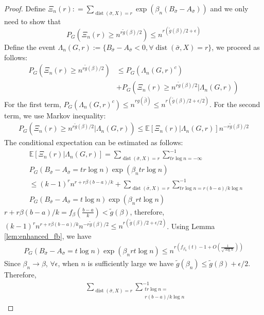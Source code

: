 \documentclass[journal]{IEEEtran}
\newcommand{\1}{\mathbbm{1}}
\DeclareMathOperator{\dist}{dist}
\begin{document}
\begin{proof}
Define $\Xi_n(r): = \sum_{\dist(\bar{\sigma}, X)=r}\exp(\beta_n(B_{\bar{\sigma}}-A_{\bar{\sigma}}))$ and we only need to show that
\begin{equation}
P_{G}(\Xi_n(r) \geq n^{r \tilde{g}(\beta) /2}) \leq  n^{r (\tilde{g}(\beta) /2 + \epsilon)}
\end{equation}
Define the event $\Lambda_n(G,r):=\{B_{\bar{\sigma}} -A_{\bar{\sigma}} < 0, \forall \dist(\bar{\sigma}, X)=r\}$,
we proceed as follows:
\begin{align*}
P_{G}(\Xi_n(r) \geq n^{r \tilde{g}(\beta) /2}) &\leq
P_G(\Lambda_n(G,r)^c) \\
&+ P_G(\Xi_n(r) \geq n^{r \tilde{g}(\beta) /2} |\Lambda_n(G,r) )
\end{align*}
For the first term, 
$P_G(\Lambda_n(G,r)^c) \leq n^{rg(\bar{\beta})} \leq n^{r (\tilde{g}(\beta) /2 + \epsilon/2)}$.
For the second term, we use Markov inequality:
\begin{align*}
P_G(\Xi_n(r) \geq n^{r \tilde{g}(\beta) /2} |\Lambda_n(G,r) )
\leq \mathbb{E}[\Xi_n(r)|\Lambda_n(G,r)]n^{-r \tilde{g}(\beta) /2} 
\end{align*}
The conditional expectation can be estimated as follows:
\begin{align*}
&\mathbb{E}[\Xi_n(r)|\Lambda_n(G,r)]=
\sum_{\dist(\bar{\sigma}, X) = r}\sum_{tr\log n = -\infty }^{-1} \\
& P_G(B_{\bar{\sigma}} -A_{\bar{\sigma}}=tr\log n)\exp(\beta_n tr \log n) \\
& \leq (k-1)^r n^{r+r\beta(b-a)/k} +
\sum_{\dist(\bar{\sigma}, X) = r}\sum_{tr\log n = r(b-a)/k\log n }^{-1} \\
& P_G(B_{\bar{\sigma}} -A_{\bar{\sigma}}=t\log n)\exp(\beta_n rt \log n)
\end{align*}
$r+r\beta(b-a)/k = f_{\beta}(\frac{b-a}{k}) < \tilde{g}(\beta)$, therefore,
$(k-1)^r n^{r+r\beta(b-a)/k}n^{-r \tilde{g}(\beta) /2} \leq n^{r (\tilde{g}(\beta) /2 + \epsilon/2)} $.
Using Lemma \ref{lem:enhanced_fb}, we have
\begin{align*}
P_G(B_{\bar{\sigma}} -A_{\bar{\sigma}}=t\log n)\exp(\beta_n rt \log n) \leq 
n^{r(f_{\beta_n}(t)-1 + O(\frac{1}{\sqrt{\log n}}))}
\end{align*}
Since $\beta_n \to \beta$, $\forall \epsilon$, when $n$ is sufficiently large
we have $\tilde{g}(\beta_n) \leq \tilde{g}(\beta) + \epsilon /2$.
Therefore,
\begin{align*}
&\sum_{\dist(\bar{\sigma}, X) = r}\sum_{\substack{tr\log n = \\ r(b-a)/k\log n} }^{-1}

\end{align*}
\end{proof}
\end{document}
